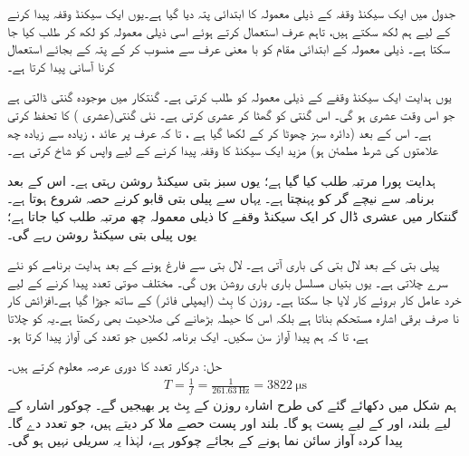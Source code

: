 جدول  میں ایک سیکنڈ وقفہ کے ذیلی معمولہ کا ابتدائی پتہ  دیا گیا ہے۔یوں ایک سیکنڈ وقفہ پیدا کرنے کے لیے ہم  لکھ سکتے ہیں، تاہم عرف استعمال کرتے ہوئے اسی ذیلی معمولہ کو  لکھ کر  طلب کیا جا سکتا ہے۔ ذیلی معمولہ کے ابتدائی مقام کو با  معنی   عرف  سے منسوب کر کے پتہ کے بجائے استعمال کرنا  آسانی پیدا کرتا ہے۔

یوں  ہدایت  ایک سیکنڈ وقفے کے ذیلی معمولہ کو طلب  کرتی ہے۔ گنتکار میں موجودہ گنتی ڈالتی ہے جو اس وقت  عشری  ہو گی۔ \DCR{\regA} اس گنتی کو گھٹا کر عشری  کرتی ہے۔   نئی گنتی(عشری   ) کا تحفظ کرتی ہے۔ اس کے بعد  (دائرہ سبز چھوٹا کر کے لکھا گیا ہے ، تا کہ عرف پر عائد ، زیادہ سے زیادہ  چھ علامتوں کی شرط مطمئن  ہو)  مزید ایک سیکنڈ کا  وقفہ پیدا کرنے کے لیے واپس  کو شاخ کرتی ہے۔

ہدایت  پورا  مرتبہ طلب کیا گیا ہے؛ یوں سبز بتی  سیکنڈ روشن  رہتی ہے۔ اس کے بعد برنامہ  سے نیچے گر کو   پہنچتا ہے۔ یہاں سے پیلی بتی قابو کرنے حصہ  شروع ہوتا ہے۔ گنتکار  میں عشری  ڈال کر ایک سیکنڈ وقفے کا ذیلی معمولہ  چھ مرتبہ طلب کیا جاتا ہے؛ یوں پیلی بتی  سیکنڈ روشن رہے گی۔

پیلی بتی کے بعد لال بتی کی باری آتی ہے۔ لال بتی  سے فارغ ہونے کے بعد  ہدایت  برنامے کو نئے سرے  چلاتی ہے۔ یوں بتیاں مسلسل باری باری روشن ہوں گی۔
 مختلف صوتی تعدد   پیدا کرنے کے لیے  خرد عامل کار بروئے کار لایا  جا سکتا ہے۔ روزن  کا بِٹ  (ایمپلی فائر)  کے ساتھ  جوڑا گیا ہے۔افزائش کار نا صرف برقی اشارہ مستحکم بناتا ہے بلکہ اس کا حیطہ بڑھانے کی صلاحیت بھی رکھتا ہے۔یہ     کو چلاتا ہے، تا کہ ہم  پیدا آواز  سن سکیں۔ ایک برنامہ لکھیں جو  تعدد کی آواز پیدا کرتا ہو۔

حل:\quad
درکار تعدد کا دوری عرصہ معلوم کرتے ہیں۔
\begin{align*}
T=\frac{1}{f}=\frac{1}{\SI{261.63}{\hertz}}=\SI{3822}{\micro\second}
\end{align*}
ہم شکل   میں دکھائے گئے کی  طرح  اشارہ  روزن  کے بِٹ  پر بھیجیں گے۔  چوکور اشارہ  کے لیے بلند، اور  کے لیے پست ہو گا۔ بلند اور پست حصے ملا کر  دیتے ہیں، جو  تعدد دے گا۔  پیدا کردہ  آواز سائن نما ہونے کے بجائے چوکور ہے، لہٰذا  یہ  سریلی  نہیں ہو گی۔

